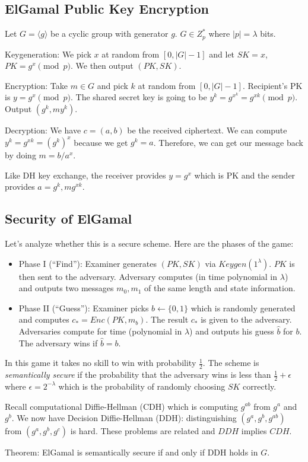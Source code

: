 \documentclass[psamsfonts]{amsart}
\begin{document}
\subsection{ElGamal Public Key Encryption}

Let $G = \langle g \rangle$ be a cyclic group with generator $g$. $G \in Z_p^*$ where $|p| = \lambda$ bits. 

Keygeneration: We pick $x$ at random from $[0, |G| - 1]$ and let $SK = x$, $PK = g^x \pmod{p}$. We then output $(PK, SK)$.

Encryption: Take $m \in G$ and pick $k$ at random from $[0, |G| -1]$. Recipient's PK is $y = g^x \pmod{p}$. The shared secret key is going to be $y^k = g^{x}^k = g^{xk} \pmod{p}$. Output $(g^k, m y^k)$.

Decryption: We have $c = (a,b)$ be the received ciphertext. We can compute $y^k = g^{xk} = (g^k)^x$ because we get $g^k = a$. Therefore, we can get our message back by doing $m = b/a^x$.

Like DH key exchange, the receiver provides $y = g^{x}$ which is PK and the sender provides $a=g^k, m g^{xk}$.

\subsection{Security of ElGamal}

Let's analyze whether this is a secure scheme. Here are the phases of the game:

\begin{itemize}
  \item Phase I (``Find''): Examiner generates $(PK, SK)$ via $Keygen(1^{\lambda})$. $PK$ is then sent to the adversary. Adversary computes (in time polynomial in $\lambda$) and outputs two messages $m_0, m_1$ of the same length and state information.
  \item Phase II (``Guess''): Examiner picks $b \leftarrow \{0,1\}$ which is randomly generated and computes $c_{*} = Enc(PK, m_b)$. The result $c_*$ is given to the adversary. Adversaries compute for time (polynomial in $\lambda$) and outputs his guess $\hat{b}$ for $b$. The adversary wins if $\hat{b} = b$.
\end{itemize}

In this game it takes no skill to win with probability $\frac{1}{2}$. The scheme is \emph{semantically secure} if the probability that the adversary wins is less than $\frac{1}{2} + \epsilon$ where $\epsilon = 2^{-\lambda}$ which is the probability of randomly choosing $SK$ correctly.

Recall computational Diffie-Hellman (CDH) which is computing $g^{ab}$ from $g^a$ and $g^b$. We now have Decision Diffie-Hellman (DDH): distinguishing $(g^a, g^b, g^{ab})$ from $(g^a, g^b, g^c)$ is hard. These problems are related and $DDH$ implies $CDH$. 

Theorem: ElGamal is semantically secure if and only if DDH holds in $G$.
\end{document}
